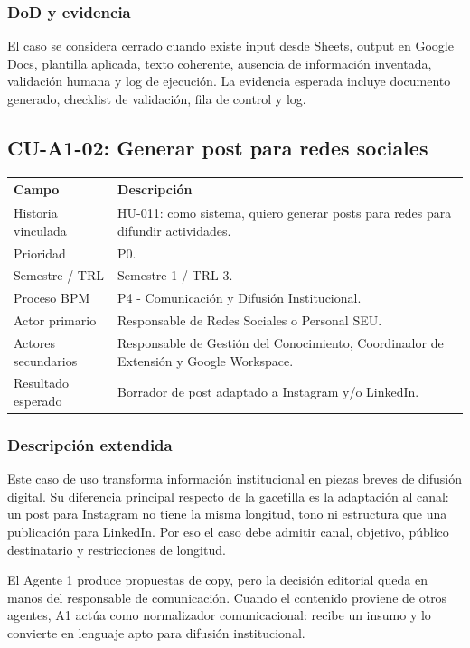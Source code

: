 \documentclass[11pt,a4paper]{article}
\begin{document}
\subsubsection{DoD y evidencia}

El caso se considera cerrado cuando existe input desde Sheets, output en Google Docs, plantilla aplicada, texto coherente, ausencia de información inventada, validación humana y log de ejecución. La evidencia esperada incluye documento generado, checklist de validación, fila de control y log.

\subsection{CU-A1-02: Generar post para redes sociales}

\begin{tabularx}{\textwidth}{p{}Y}
\toprule
\textbf{Campo} & \textbf{Descripción} \\
\midrule
Historia vinculada & HU-011: como sistema, quiero generar posts para redes para difundir actividades. \\
Prioridad & P0. \\
Semestre / TRL & Semestre 1 / TRL 3. \\
Proceso BPM & P4 - Comunicación y Difusión Institucional. \\
Actor primario & Responsable de Redes Sociales o Personal SEU. \\
Actores secundarios & Responsable de Gestión del Conocimiento, Coordinador de Extensión y Google Workspace. \\
Resultado esperado & Borrador de post adaptado a Instagram y/o LinkedIn. \\
\bottomrule
\end{tabularx}

\subsubsection{Descripción extendida}

Este caso de uso transforma información institucional en piezas breves de difusión digital. Su diferencia principal respecto de la gacetilla es la adaptación al canal: un post para Instagram no tiene la misma longitud, tono ni estructura que una publicación para LinkedIn. Por eso el caso debe admitir canal, objetivo, público destinatario y restricciones de longitud.

El Agente 1 produce propuestas de copy, pero la decisión editorial queda en manos del responsable de comunicación. Cuando el contenido proviene de otros agentes, A1 actúa como normalizador comunicacional: recibe un insumo y lo convierte en lenguaje apto para difusión institucional.
\end{document}
